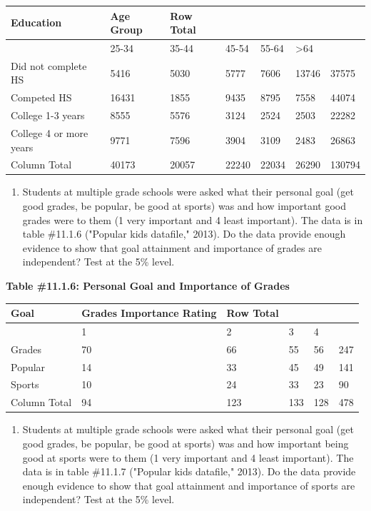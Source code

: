 \documentclass[]{book}
\providecommand{\tightlist}{%
  \setlength{\itemsep}{0pt}\setlength{\parskip}{0pt}}
\begin{document}
\begin{longtable}[]{@{}lllllll@{}}
\toprule
Education & Age Group & Row Total & & & &\tabularnewline
\midrule
\endhead
& 25-34 & 35-44 & 45-54 & 55-64 & \textgreater{}64 &\tabularnewline
Did not complete HS & 5416 & 5030 & 5777 & 7606 & 13746 & 37575\tabularnewline
Competed HS & 16431 & 1855 & 9435 & 8795 & 7558 & 44074\tabularnewline
College 1-3 years & 8555 & 5576 & 3124 & 2524 & 2503 & 22282\tabularnewline
College 4 or more years & 9771 & 7596 & 3904 & 3109 & 2483 & 26863\tabularnewline
Column Total & 40173 & 20057 & 22240 & 22034 & 26290 & 130794\tabularnewline
\bottomrule
\end{longtable}

\begin{enumerate}
\def\labelenumi{\arabic{enumi}.}
\setcounter{enumi}{4}
\tightlist
\item
  Students at multiple grade schools were asked what their personal goal (get good grades, be popular, be good at sports) was and how important good grades were to them (1 very important and 4 least important). The data is in table \#11.1.6 ("Popular kids datafile," 2013). Do the data provide enough evidence to show that goal attainment and importance of grades are independent? Test at the 5\% level.
\end{enumerate}

\textbf{Table \#11.1.6: Personal Goal and Importance of Grades}

\begin{longtable}[]{@{}llllll@{}}
\toprule
Goal & Grades Importance Rating & Row Total & & &\tabularnewline
\midrule
\endhead
& 1 & 2 & 3 & 4 &\tabularnewline
Grades & 70 & 66 & 55 & 56 & 247\tabularnewline
Popular & 14 & 33 & 45 & 49 & 141\tabularnewline
Sports & 10 & 24 & 33 & 23 & 90\tabularnewline
Column Total & 94 & 123 & 133 & 128 & 478\tabularnewline
\bottomrule
\end{longtable}

\begin{enumerate}
\def\labelenumi{\arabic{enumi}.}
\setcounter{enumi}{5}
\tightlist
\item
  Students at multiple grade schools were asked what their personal goal (get good grades, be popular, be good at sports) was and how important being good at sports were to them (1 very important and 4 least important). The data is in table \#11.1.7 ("Popular kids datafile," 2013). Do the data provide enough evidence to show that goal attainment and importance of sports are independent? Test at the 5\% level.
\end{enumerate}
\end{document}
